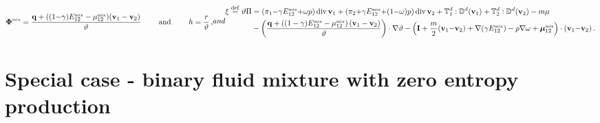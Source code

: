 \documentclass[a4paper]{article}
\begin{document}
\begin{subequations} 
\label{pepa:999}
\begin{align}
\entropyfluxmix = \frac{\qqi+((1{-}\gamma)\EEEmix - \mumix)(\vv_1-\vv_2)}{\vartheta} \qquad\text{ and }\qquad
\entropysupply = \frac{\ri}{\vartheta}\,,
\end{align}
and
\begin{align}
\nonumber
\xi\eqdef \vartheta\entropyproduction &=   (\mns_1{-}\gamma\EEEmix{+}\weight p)\div\vv_1 + (\mns_2{+}\gamma\EEEmix{+}(1{-}\weight)p)\div\vv_2 + \TT^d_1:\DD^d(\vv_1) + \TT^d_2:\DD^d(\vv_2)  -m \mu  \\\label{eq-entropy-prod-final} &  -\left(\frac{\qqi+\left((1-\gamma)\EEEmix -\mumix\right)(\vv_1-\vv_2)}{\vartheta}\right)\cdot\nabla\vartheta - \left(\vecI + \frac{m}{2}(\vv_1{-}\vv_2) + \nabla(\gamma\EEEmix) - p\nabla \weight + \mumixvec  \right)\cdot(\vv_1{-}\vv_2)\,.
\end{align}
\end{subequations}
\section{Special case - binary fluid mixture with zero entropy production}
\label{sec-nondisspative}
\end{document}
